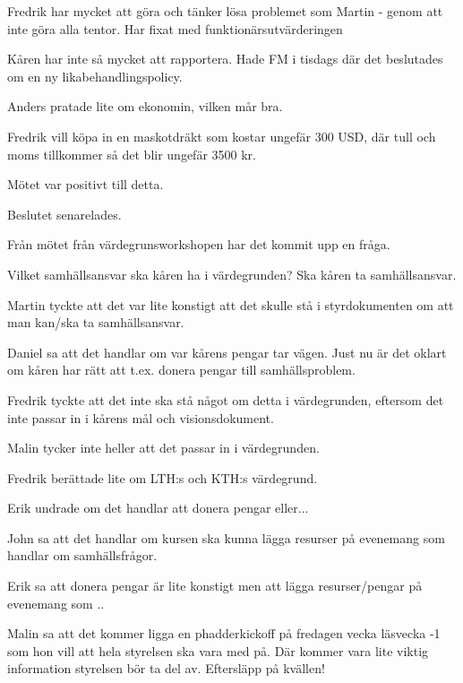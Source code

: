 \documentclass[10pt]{article}
\begin{document}
\begin{paragrafer}
\begin{paragrafer}
Fredrik har mycket att göra och tänker lösa problemet som Martin - genom att inte göra alla tentor. Har fixat med funktionärsutvärderingen


Kåren har inte så mycket att rapportera. Hade FM i tisdags där det beslutades om en ny likabehandlingspolicy.


Anders pratade lite om ekonomin, vilken mår bra.

\end{paragrafer}

Fredrik vill köpa in en maskotdräkt som kostar ungefär 300 USD, där tull och moms tillkommer så det blir ungefär 3500 kr.

Mötet var positivt till detta.

Beslutet senarelades.

Från mötet från värdegrunsworkshopen har det kommit upp en fråga.

Vilket samhällsansvar ska kåren ha i värdegrunden? Ska kåren ta samhällsansvar.

Martin tyckte att det var lite konstigt att det skulle stå i styrdokumenten om att man kan/ska ta samhällsansvar.

Daniel sa att det handlar om var kårens pengar tar vägen. Just nu är det oklart om kåren har rätt att t.ex. donera pengar till samhällsproblem.

Fredrik tyckte att det inte ska stå något om detta i värdegrunden, eftersom det inte passar in i kårens mål och visionsdokument.

Malin tycker inte heller att det passar in i värdegrunden.

Fredrik berättade lite om LTH:s och KTH:s värdegrund.

Erik undrade om det handlar att donera pengar eller...

John sa att det handlar om kursen ska kunna lägga resurser på evenemang som handlar om samhällsfrågor.

Erik sa att donera pengar är lite konstigt men att lägga resurser/pengar på evenemang som ..

Malin sa att det kommer ligga en phadderkickoff på fredagen vecka läsvecka -1 som hon vill att hela styrelsen ska vara med på. Där kommer vara lite viktig information styrelsen bör ta del av. Eftersläpp på kvällen!


\end{paragrafer}
\end{document}
